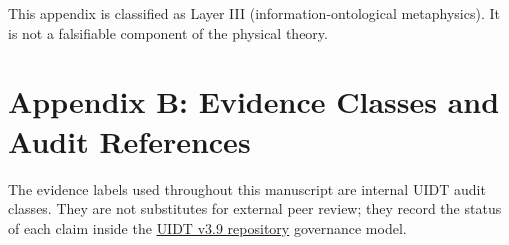 \documentclass[12pt,a4paper,twoside]{article}
\theoremstyle{plain}
\theoremstyle{definition}
\theoremstyle{remark}
\begin{document}
This appendix is classified as Layer III (information-ontological metaphysics).
It is not a falsifiable component of the physical theory.


\newpage

\section*{Appendix B: Evidence Classes and Audit References}
\label{app:evidence-audit}

The evidence labels used throughout this manuscript are internal UIDT audit
classes. They are not substitutes for external peer review; they record the
status of each claim inside the \href{https://github.com/Mass-Gap/UIDT-Framework-v3.9-Canonical}{UIDT v3.9 repository} governance model.
\end{document}
